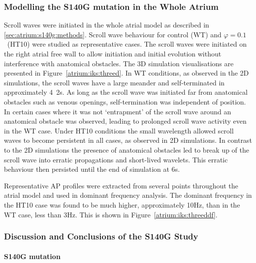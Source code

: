 \subsubsection{Modelling the S140G mutation in the Whole Atrium}

Scroll waves were initiated in the whole atrial model as described in
\ref{sec:atrium:s140g:methods}.
Scroll wave behaviour for control (WT) and $\varphi = 0.1$\ (HT10) were studied
as representative cases.
The scroll waves were initiated on the right atrial free wall to allow
initiation and initial evolution without interference with anatomical obstacles.
The 3D simulation visualisations are presented in
Figure~\ref{atrium:iks:threed}.
In WT conditions, as observed in the 2D simulations, the scroll waves have a
large meander and self-terminated in approximately \unit{4.2}{s}.
As long as the scroll wave was initiated far from anatomical obstacles such as
venous openings, self-termination was independent of position.
In certain cases where it was not `entrapment' of the scroll wave around an
anatomical obstacle was observed, leading to prolonged scroll wave activity even
in the WT case.
Under HT10 conditions the small wavelength allowed scroll waves to become
persistent in all cases, as observed in 2D simulations.
In contrast to the 2D simulations the presence of anatomical obstacles led to break up of the
scroll wave into erratic propagations and short-lived wavelets.
This erratic behaviour then persisted until the end of simulation at
\unit{6}{s}.

Representative AP profiles were extracted from several points throughout the
atrial model and used in dominant frequency analysis.
The dominant frequency in the HT10 case was found to be much higher,
approximately \unit{10}{Hz}, than in the WT case, less than \unit{3}{Hz}.
This is shown in Figure~\ref{atrium:iks:threeddf}.

\subsubsection{Discussion and Conclusions of the S140G Study}

\paragraph{S140G mutation}

